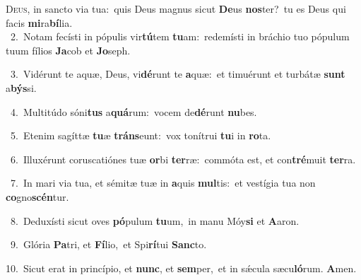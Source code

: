 \lettrine{\initial\textcolor{\initialcolor}{D}}{eus,} in sancto via tua:~\dagger quis Deus magnus sicut \textbf{De}\-us \textbf{nos}\-ter?~\star tu es Deus qui facis \textbf{mi}\-ra\-\textbf{bí}\-lia.\\
{\numbfont\textcolor{\numbcolor}{~2.}}~Notam fecísti in pópulis vir\-\textbf{tú}\-tem \textbf{tu}\-am:~\star redemísti in bráchio tuo pópulum tuum fílios \textbf{Ja}\-cob et \textbf{Jo}\-seph.\par
{\numbfont\textcolor{\numbcolor}{~3.}}~Vidérunt te aquæ, Deus, vi\-\textbf{dé}\-runt te \textbf{a}\-quæ:~\star et timuérunt et turbátæ \textbf{sunt} a\-\textbf{býs}\-si.\par
{\numbfont\textcolor{\numbcolor}{~4.}}~Multitúdo sóni\textbf{tus} a\-\textbf{quá}\-rum:~\star vocem de\-\textbf{dé}\-runt \textbf{nu}\-bes.\par
{\numbfont\textcolor{\numbcolor}{~5.}}~Etenim sagíttæ \textbf{tu}\-æ \textbf{tráns}\-eunt:~\star vox tonítrui \textbf{tu}\-i in \textbf{ro}\-ta.\par
{\numbfont\textcolor{\numbcolor}{~6.}}~Illuxérunt coruscatiónes tuæ \textbf{or}\-bi \textbf{ter}\-ræ:~\star commóta est, et con\-\textbf{tré}\-muit \textbf{ter}\-ra.\par
{\numbfont\textcolor{\numbcolor}{~7.}}~In mari via tua, et sémitæ tuæ in \textbf{a}\-quis \textbf{mul}\-tis:~\star et vestígia tua non \textbf{co}\-gno\-\textbf{scén}\-tur.\par
{\numbfont\textcolor{\numbcolor}{~8.}}~Deduxísti sicut oves \textbf{pó}\-pulum \textbf{tu}\-um,~\star in manu Móy\textbf{si} et \textbf{A}\-aron.\par
{\numbfont\textcolor{\numbcolor}{~9.}}~Glória \textbf{Pa}\-tri, et \textbf{Fí}\-lio,~\star et Spi\-\textbf{rí}\-tui \textbf{Sanc}\-to.\par
{\numbfont\textcolor{\numbcolor}{10.}}~Sicut erat in princípio, et \textbf{nunc}\-, et \textbf{sem}\-per,~\star et in sǽcula sæcu\-\textbf{ló}\-rum. \textbf{A}\-men.\par
